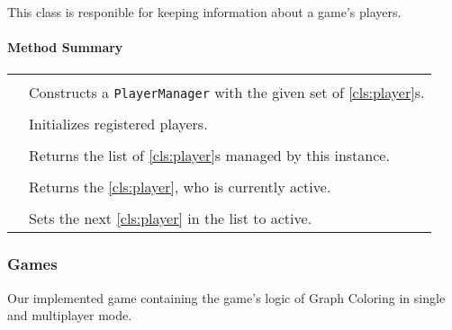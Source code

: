 This class is responible for keeping information about a game's players.  \\

\centerdash

\paragraph*{Method Summary}
\paragraph*{}
\begin{longtable}{Lp{10cm}}
	\startmethodtable
	 \\
	& Constructs a \texttt{PlayerManager} with the given set of \ref{cls:player}s. \\
	 \\
	& Initializes registered players. \\
	 \\
	& Returns the list of \ref{cls:player}s managed by this instance. \\
	 \\
	& Returns the \ref{cls:player}, who is currently active. \\
	 \\
	& Sets the next \ref{cls:player} in the list to active. \\
	
	
	\hline
\end{longtable}



\subsubsection{Games}


Our implemented game containing the game's logic of Graph Coloring in single and multiplayer mode. \\

\centerdash

